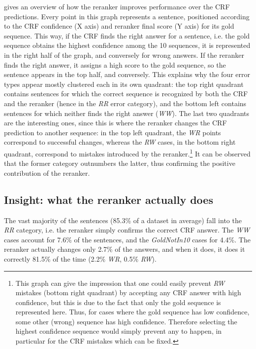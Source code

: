 \documentclass[output=paper,modfonts,nonflat]{langsci/langscibook}
\begin{document}
 gives an overview of how
the reranker improves performance over the CRF predictions. Every
point in this graph represents a sentence, positioned according to the
CRF confidence (X axis) and reranker final score (Y axis) for its gold
sequence. This way, if the CRF finds the right answer for a sentence,
i.e. the gold sequence obtains the highest confidence among the 10
sequences, it is represented in the right half of the graph, and
conversely for wrong answers. If the reranker finds the right answer,
it assigns a high score to the gold sequence, so the sentence appears
in the top half, and conversely. This explains why the four error
types appear mostly clustered each in its own quadrant: the top right
quadrant contains sentences for which the correct sequence is
recognized by both the CRF and the reranker (hence in the {\it RR}
error category), and the bottom left contains sentences for which
neither finds the right answer ({\it WW}). The last two quadrants are
the interesting ones, since this is where the reranker changes the CRF
prediction to another sequence: in the top left quadrant, the {\it WR} points
correspond to successful changes, whereas the {\it RW} cases, in the
bottom right quadrant, correspond to mistakes introduced by the
reranker.\footnote{This graph can give the impression that one could
  easily prevent {\it RW} mistakes (bottom right quadrant) by
  accepting any CRF answer with high confidence, but this is due to
  the fact that only the gold sequence is represented here. Thus, for
  cases where the gold sequence has low confidence, some other (wrong)
  sequence has high confidence. Therefore selecting the highest
  confidence sequence would simply prevent any  to happen, in
  particular for the CRF mistakes which can be fixed.} It can be
observed that the former category outnumbers the latter, thus
confirming the positive contribution of the reranker.





\subsection{Insight: what the reranker actually does}

The vast majority of the sentences (85.3\% of a dataset in average)
fall into the {\em RR} category, i.e. the reranker simply confirms the
correct CRF answer. The {\em WW} cases account for 7.6\% of the sentences, and
the {\em GoldNotIn10} cases for 4.4\%. The reranker actually changes
only 2.7\% of the answers, and when it does, it does it correctly
81.5\% of the time (2.2\% {\em WR}, 0.5\% {\em RW}).
\end{document}
